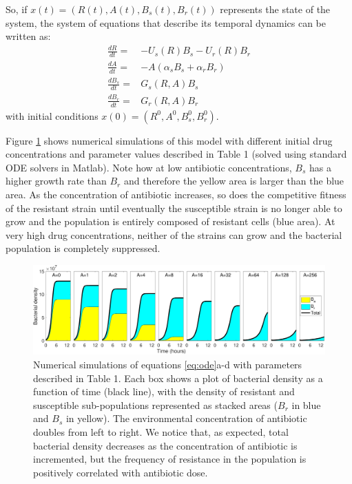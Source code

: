 \documentclass[fleqn,12pt]{wlscirep}
\begin{document}
So, if $x(t)=(R(t),A(t),B_s(t),B_r(t))$ represents the state of the system, the system of equations that describe its temporal dynamics can be written as:
\begin{subequations}
\begin{align}
 \frac{dR}{dt}=&-U_s(R)B_s-U_r(R)B_r \label{odes1} \\
 \frac{dA}{dt}=& - A(\alpha_s B_s   + \alpha_r B_r) \label{odes2}\\
 \frac{dB_s}{dt}=&  G_s(R,A)  B_s \label{odes3}\\
 \frac{dB_r}{dt}=&  G_r(R,A)  B_r \label{odes4}
\end{align}
\label{eq:ode}
\end{subequations}
with initial conditions $x(0)=(R^0, A^0, B_{s}^0, B_{r}^0)$. 

Figure \ref{fig:figure2} shows numerical simulations of this model with different initial drug concentrations and parameter values described in Table 1 (solved using standard ODE solvers in Matlab). Note how at low antibiotic concentrations, $B_s$ has a higher growth rate than $B_r$ and therefore the yellow area is larger than the blue area. As the concentration of antibiotic increases, so does the competitive fitness of the resistant strain until eventually the susceptible strain is no longer able to grow and the population is entirely composed of resistant cells (blue area). At very high drug concentrations, neither of the strains can grow and the bacterial population is completely suppressed.

\begin{figure}[ht!]
\centering
\includegraphics[width=1\linewidth]{figures/Figure2.pdf}
\caption{\footnotesize Numerical simulations of equations \ref{eq:ode}a-d with parameters described in Table 1. Each box shows a plot of bacterial density as a function of time (black line), with the density of resistant and susceptible sub-populations represented as stacked areas ($B_r$ in blue and $B_s$ in yellow). The environmental concentration of antibiotic doubles from left to right. We notice that, as expected, total bacterial density decreases as the concentration of antibiotic is incremented, but the frequency of resistance in the population is positively correlated with antibiotic dose.}
\label{fig:figure2}
\end{figure}
\end{document}

